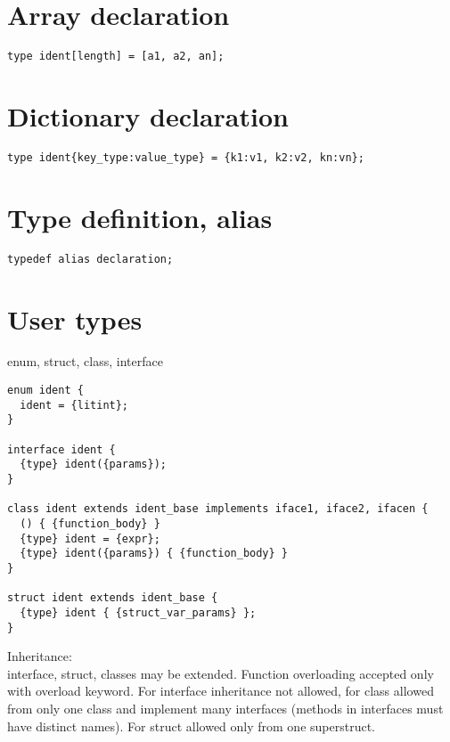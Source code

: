 \documentclass[a4paper,12pt]{book}
\begin{document}
\section{Array declaration}

\begin{verbatim}
type ident[length] = [a1, a2, an];
\end{verbatim}

\section{Dictionary declaration}

\begin{verbatim}
type ident{key_type:value_type} = {k1:v1, k2:v2, kn:vn};
\end{verbatim}

\section{Type definition, alias}

\begin{verbatim}
typedef alias declaration;
\end{verbatim}

\section{User types}

enum, struct, class, interface\\

\begin{verbatim}
enum ident {
  ident = {litint};
}

interface ident {
  {type} ident({params});
}

class ident extends ident_base implements iface1, iface2, ifacen {
  () { {function_body} }
  {type} ident = {expr};
  {type} ident({params}) { {function_body} }
}

struct ident extends ident_base {
  {type} ident { {struct_var_params} };
}
\end{verbatim}

Inheritance:\\

interface, struct, classes may be extended. Function overloading accepted only
with overload keyword. For interface inheritance not allowed, for class
allowed from only one class and implement many interfaces (methods in
interfaces must have distinct names). For struct allowed only from one
superstruct.
\end{document}

